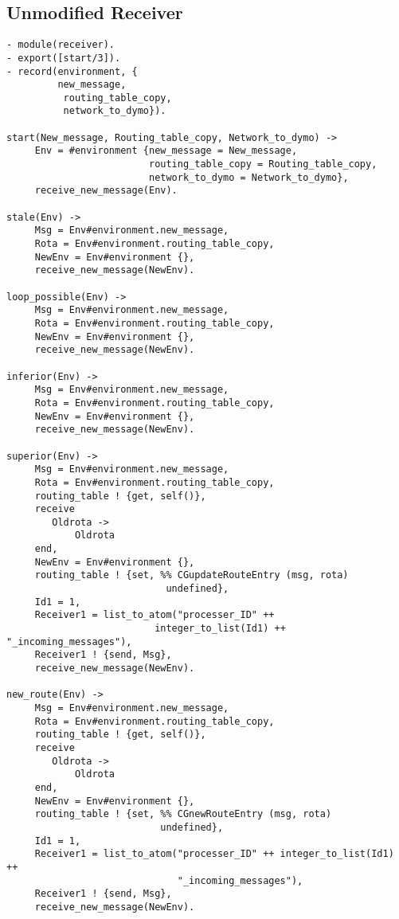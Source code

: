 \subsection*{Unmodified Receiver}

\footnotesize
\begin{verbatim}
- module(receiver).
- export([start/3]).
- record(environment, {
         new_message,
          routing_table_copy,
          network_to_dymo}).

start(New_message, Routing_table_copy, Network_to_dymo) -> 
     Env = #environment {new_message = New_message, 
                         routing_table_copy = Routing_table_copy, 
                         network_to_dymo = Network_to_dymo},
     receive_new_message(Env).

stale(Env) -> 
     Msg = Env#environment.new_message,
     Rota = Env#environment.routing_table_copy,
     NewEnv = Env#environment {},
     receive_new_message(NewEnv).

loop_possible(Env) -> 
     Msg = Env#environment.new_message,
     Rota = Env#environment.routing_table_copy,
     NewEnv = Env#environment {},
     receive_new_message(NewEnv).

inferior(Env) -> 
     Msg = Env#environment.new_message,
     Rota = Env#environment.routing_table_copy,
     NewEnv = Env#environment {},
     receive_new_message(NewEnv).

superior(Env) -> 
     Msg = Env#environment.new_message,
     Rota = Env#environment.routing_table_copy,
     routing_table ! {get, self()},
     receive 
        Oldrota -> 
            Oldrota
     end,
     NewEnv = Env#environment {},
     routing_table ! {set, %% CGupdateRouteEntry (msg, rota)
                            undefined},
     Id1 = 1,
     Receiver1 = list_to_atom("processer_ID" ++ 
                          integer_to_list(Id1) ++ "_incoming_messages"),
     Receiver1 ! {send, Msg},
     receive_new_message(NewEnv).

new_route(Env) -> 
     Msg = Env#environment.new_message,
     Rota = Env#environment.routing_table_copy,
     routing_table ! {get, self()},
     receive 
        Oldrota -> 
            Oldrota
     end,
     NewEnv = Env#environment {},
     routing_table ! {set, %% CGnewRouteEntry (msg, rota)
                           undefined},
     Id1 = 1,
     Receiver1 = list_to_atom("processer_ID" ++ integer_to_list(Id1) ++ 
                              "_incoming_messages"),
     Receiver1 ! {send, Msg},
     receive_new_message(NewEnv).


\end{verbatim}
